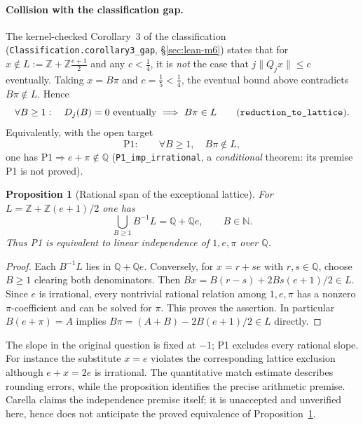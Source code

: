 \documentclass[11pt]{amsart}
\newtheorem{proposition}[theorem]{Proposition}
\theoremstyle{definition}
\theoremstyle{remark}
\numberwithin{equation}{section}
\newcommand{\Q}{\mathbb{Q}}
\newcommand{\Z}{\mathbb{Z}}
\newcommand{\N}{\mathbb{N}}
\begin{document}
\paragraph{Collision with the classification gap.} The kernel-checked Corollary~3 of the classification (\texttt{Classification.\allowbreak{}corollary3\_\allowbreak{}gap}, \S\ref{sec:lean-m6}) states that for $x\notin L:=\Z+\Z\frac{e+1}{2}$ and any $c<\tfrac14$, it is \emph{not} the case that $j\|Q_jx\|\le c$ eventually. Taking $x=B\pi$ and $c=\tfrac15<\tfrac14$, the eventual bound above contradicts $B\pi\notin L$. Hence
\[
\forall B\ge1:\quad D_j(B)=0\ \text{eventually}\ \Longrightarrow\ B\pi\in L
\qquad\text{(\texttt{reduction\_to\_lattice}).}
\]
Equivalently, with the open target
\[
\mathrm{P1}:\qquad \forall B\ge1,\quad B\pi\notin L,
\]
one has $\mathrm{P1}\Rightarrow e+\pi\notin\Q$ (\texttt{P1\_imp\_irrational}, a \emph{conditional} theorem: its premise P1 is not proved).

\begin{proposition}[Rational span of the exceptional lattice]
\label{prop:rational-span}
For $L=\Z+\Z(e+1)/2$ one has
\[
\bigcup_{B\ge1} B^{-1}L=\Q+\Q e,\qquad B\in\N.
\]
Thus P1 is equivalent to linear independence of $1,e,\pi$ over $\Q$.
\end{proposition}
\begin{proof}
Each $B^{-1}L$ lies in $\Q+\Q e$. Conversely, for $x=r+se$ with
$r,s\in\Q$, choose $B\ge1$ clearing both denominators. Then
$Bx=B(r-s)+2Bs(e+1)/2\in L$. Since $e$ is irrational, every
nontrivial rational relation among $1,e,\pi$ has a nonzero
$\pi$-coefficient and can be solved for $\pi$. This proves the assertion.
In particular $B(e+\pi)=A$ implies
$B\pi=(A+B)-2B(e+1)/2\in L$ directly.
\end{proof}
The slope in the original question is fixed at $-1$; P1 excludes every
rational slope. For instance the substitute $x=e$ violates the
corresponding lattice exclusion although $e+x=2e$ is irrational.
The quantitative match estimate describes rounding errors, while the
proposition identifies the precise arithmetic premise. Carella \cite{CarellaLI} claims the independence premise itself; it is unaccepted and unverified here, hence does not anticipate the proved equivalence of Proposition~\ref{prop:rational-span}.
\end{document}
